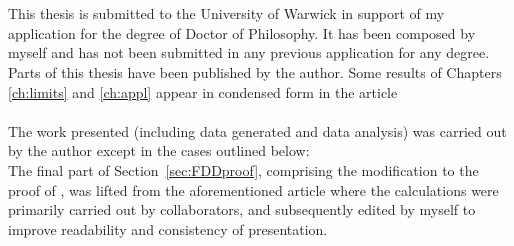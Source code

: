 \documentclass[oneside]{scrbook} %
\theoremstyle{definition}
\newcommand{\1}[1]{\mathbbm{1}_{#1}} %
\begin{document}





%
\chapter*{} %

This thesis is submitted to the University of Warwick in support of my application for the degree of Doctor of Philosophy. It has been composed by myself and has not been submitted in any previous application for any degree.
\\[5pt]
Parts of this thesis have been published by the author.
Some results of Chapters \ref{ch:limits} and \ref{ch:appl} appear in condensed form in the article
\\
\\[5pt]
The work presented (including data generated and data analysis) was carried out by the author except in the cases outlined below:
\\
The final part of Section~\ref{sec:FDDproof}, comprising the modification to the proof of \textcite{koskela2018}, was lifted from the aforementioned article \parencite{brown2021} where the calculations were primarily carried out by collaborators, and subsequently edited by myself to improve readability and consistency of presentation.
\end{document}
